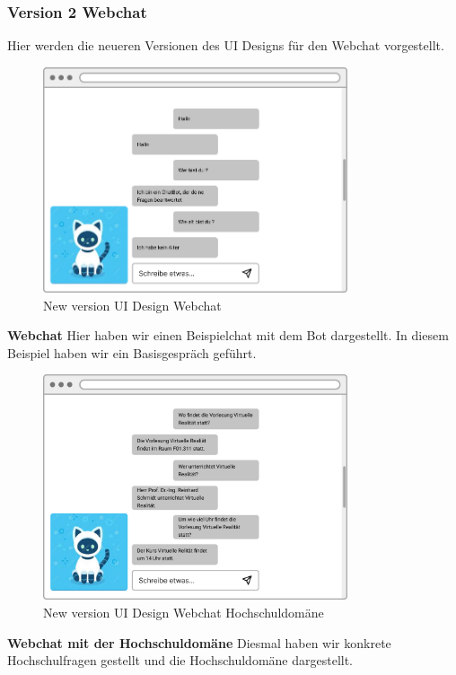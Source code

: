 \subsubsection{Version 2 Webchat}
Hier werden die neueren Versionen des UI Designs für den Webchat vorgestellt.
\begin{figure}[H]
    \centering
    \includegraphics[width=0.8\textwidth]{bilder/new vers. UI Design/WebChat/WebChat.png}
    \caption{New version UI Design Webchat}
    \label{fig:New version UI Design Webchat}
    \end{figure}
\noindent \textbf{Webchat} \newline
Hier haben wir einen Beispielchat mit dem Bot dargestellt. In diesem Beispiel haben wir ein
Basisgespräch geführt.

\begin{figure}[H]
    \centering
    \includegraphics[width=0.8\textwidth]{bilder/new vers. UI Design/WebChat/WebChat Hochschule.png}
    \caption{New version UI Design Webchat Hochschuldomäne}
    \label{fig:New version UI Design Webchat Hochschuldomäne}
    \end{figure}
\noindent \textbf{Webchat mit der Hochschuldomäne} \newline
Diesmal haben wir konkrete Hochschulfragen gestellt und die Hochschuldomäne dargestellt.

